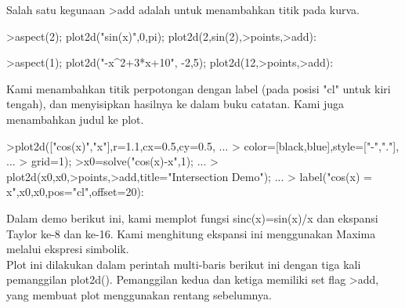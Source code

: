 \documentclass{article}
\begin{document}
\begin{eulernotebook}
\begin{eulercomment}
\begin{eulercomment}
\begin{eulercomment}
\begin{eulercomment}
\begin{eulercomment}
\begin{eulercomment}
\begin{eulercomment}
\begin{eulercomment}
\begin{eulercomment}
Salah satu kegunaan \textgreater{}add adalah untuk menambahkan titik pada kurva.
\end{eulercomment}
\begin{eulerprompt}
>aspect(2); plot2d("sin(x)",0,pi); plot2d(2,sin(2),>points,>add):
\end{eulerprompt}
\begin{eulerprompt}
>aspect(1); plot2d("-x^2+3*x+10", -2,5); plot2d(12,>points,>add):
\end{eulerprompt}
\begin{eulercomment}
Kami menambahkan titik perpotongan dengan label (pada posisi "cl"
untuk kiri tengah), dan menyisipkan hasilnya ke dalam buku catatan.
Kami juga menambahkan judul ke plot.
\end{eulercomment}
\begin{eulerprompt}
>plot2d(["cos(x)","x"],r=1.1,cx=0.5,cy=0.5, ...
>  color=[black,blue],style=["-","."], ...
>  grid=1);
>x0=solve("cos(x)-x",1);  ...
>  plot2d(x0,x0,>points,>add,title="Intersection Demo");  ...
>  label("cos(x) = x",x0,x0,pos="cl",offset=20):
\end{eulerprompt}
\begin{eulercomment}
Dalam demo berikut ini, kami memplot fungsi sinc(x)=sin(x)/x dan
ekspansi Taylor ke-8 dan ke-16. Kami menghitung ekspansi ini
menggunakan Maxima melalui ekspresi simbolik.\\
Plot ini dilakukan dalam perintah multi-baris berikut ini dengan tiga
kali pemanggilan plot2d(). Pemanggilan kedua dan ketiga memiliki set
flag \textgreater{}add, yang membuat plot menggunakan rentang sebelumnya.


\end{eulercomment}
\end{eulercomment}
\end{eulercomment}
\end{eulercomment}
\end{eulercomment}
\end{eulercomment}
\end{eulercomment}
\end{eulercomment}
\end{eulercomment}
\end{eulernotebook}
\end{document}

